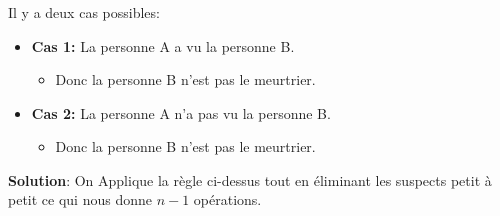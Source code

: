 \begin{frame}
    \frametitle{\problemtitle}
    Il y a deux cas possibles:
    \begin{itemize}
        \item<+-> \textbf{Cas 1:} La personne A a vu la personne B.
            \begin{itemize}
                \item<+-> Donc la personne B n'est pas le meurtrier.
            \end{itemize}
        \item<+-> \textbf{Cas 2:} La personne A n'a pas vu la personne B.
            \begin{itemize}
                \item<+-> Donc la personne B n'est pas le meurtrier.
            \end{itemize}
    \end{itemize}
    \textbf{Solution}: On Applique la règle ci-dessus tout en éliminant les suspects petit à petit ce qui nous donne $n-1$ opérations. 
\end{frame}

